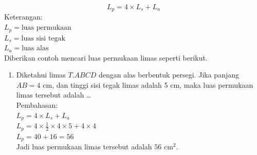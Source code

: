 \documentclass[12pt]{article}
\begin{document}
\begin{enumerate}
\begin{enumerate}
        \begin{equation}
            L_p = 4 \times L_s + L_a
        \end{equation}
        Keterangan:\\
        $ L_p = \text{luas permukaan} $\\
        $ L_s = \text{luas sisi tegak} $\\
        $ L_a = \text{luas alas} $\\
        Diberikan contoh mencari luas permukaan limas seperti berikut.\\
        \begin{enumerate}[label=\arabic*)]
            \item Diketahui limas \( T.ABCD \) dengan alas berbentuk persegi. Jika panjang \( AB = 4\text{ cm} \), dan tinggi sisi tegak limas adalah 5 cm, maka luas permukaan limas tersebut adalah \dots\\
            Pembahasan:\\
            $ L_p = 4 \times L_s + L_a $\\
            $ L_p = 4 \times \frac{1}{2} \times 4 \times 5 + 4 \times 4 $\\
            $ L_p = 40 + 16 = 56 $\\
            Jadi luas permukaan limas tersebut adalah \( 56 \text{ cm}^2 \).\\
        \end{enumerate}

    \end{enumerate}

\end{enumerate}
\end{document}
